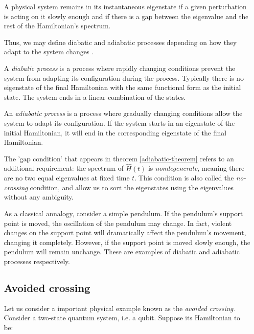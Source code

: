 \begin{theorem}
\label{adiabatic-theorem}
	A physical system remains in its instantaneous eigenstate if a given perturbation is acting on it slowly enough and if there is a gap between the eigenvalue and the rest of the Hamiltonian's spectrum.
\end{theorem}

Thus, we may define diabatic and adiabatic processes depending on how they adapt to the system changes \cite{Kato1950}.

\begin{definition}
	A \emph{diabatic process} is a process where rapidly changing conditions prevent the system from adapting its configuration during the process. Typically there is no eigenstate of the final Hamiltonian with the same functional form as the initial state. The system ends in a linear combination of the states.
\end{definition}

\begin{definition}
	An \emph{adiabatic process} is a process where gradually changing conditions allow the system to adapt its configuration. If the system starts in an eigenstate of the initial Hamiltonian, it will end in the corresponding eigenstate of the final Hamiltonian.
\end{definition}

The 'gap condition' that appears in theorem \ref{adiabatic-theorem} refers to an additional requirement: the spectrum of $\hat H(t)$ is \emph{nondegenerate}, meaning there are no two equal eigenvalues at fixed time $t$. This condition is also called the \emph{no-crossing} condition, and allow us to sort the eigenstates using the eigenvalues without any ambiguity.

As a classical annalogy, consider a simple pendulum. If the pendulum's support point is moved, the oscillation of the pendulum may change. In fact, violent changes on the support point will dramatically affect the pendulum's movement, changing it completely. However, if the support point is moved slowly enough, the pendulum will remain unchange. These are examples of diabatic and adiabatic processes respectively.


\subsection{Avoided crossing}


Let us consider a important physical example known as the \emph{avoided crossing}. Consider a two-state quantum system, i.e. a qubit. Suppose its Hamiltonian to be:

